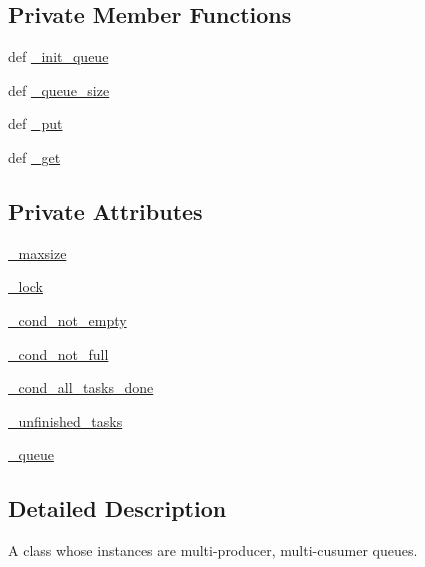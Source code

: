 \subsection*{Private Member Functions}
\begin{DoxyCompactItemize}
\item 
def \hyperlink{class__cookbook_1_1thread_1_1my__queue_1_1MyQueue_ab654b5e36b4cc4d199360fda3c45e5cb}{\-\_\-init\-\_\-queue}
\item 
def \hyperlink{class__cookbook_1_1thread_1_1my__queue_1_1MyQueue_a916e03faf976d1f2e5ca1eb144bd260f}{\-\_\-queue\-\_\-size}
\item 
def \hyperlink{class__cookbook_1_1thread_1_1my__queue_1_1MyQueue_a3900db1ad5d80f30c0af8f96b36794c2}{\-\_\-put}
\item 
def \hyperlink{class__cookbook_1_1thread_1_1my__queue_1_1MyQueue_a44dbd36a7138e556841b7e37f71d2f6d}{\-\_\-get}
\end{DoxyCompactItemize}
\subsection*{Private Attributes}
\begin{DoxyCompactItemize}
\item 
\hyperlink{class__cookbook_1_1thread_1_1my__queue_1_1MyQueue_a60146b776c7697f2c44a7def52f96add}{\-\_\-maxsize}
\item 
\hyperlink{class__cookbook_1_1thread_1_1my__queue_1_1MyQueue_a89d49165c60fbe8c6f3b95ee39af48fd}{\-\_\-lock}
\item 
\hyperlink{class__cookbook_1_1thread_1_1my__queue_1_1MyQueue_af25788e43ddebdb88598336257767d7e}{\-\_\-cond\-\_\-not\-\_\-empty}
\item 
\hyperlink{class__cookbook_1_1thread_1_1my__queue_1_1MyQueue_a35b085cc547625cb027ce8389214eedb}{\-\_\-cond\-\_\-not\-\_\-full}
\item 
\hyperlink{class__cookbook_1_1thread_1_1my__queue_1_1MyQueue_a39fe4c64fec0ccaf6c01063fe1c4d2dd}{\-\_\-cond\-\_\-all\-\_\-tasks\-\_\-done}
\item 
\hyperlink{class__cookbook_1_1thread_1_1my__queue_1_1MyQueue_a7ba895923806b0797c84dedb2eb6bbf9}{\-\_\-unfinished\-\_\-tasks}
\item 
\hyperlink{class__cookbook_1_1thread_1_1my__queue_1_1MyQueue_ab96b072fd4230d0ba12b280cc302996a}{\-\_\-queue}
\end{DoxyCompactItemize}


\subsection{Detailed Description}
\begin{DoxyVerb}A class whose instances are multi-producer, multi-cusumer queues.\end{DoxyVerb}
 

